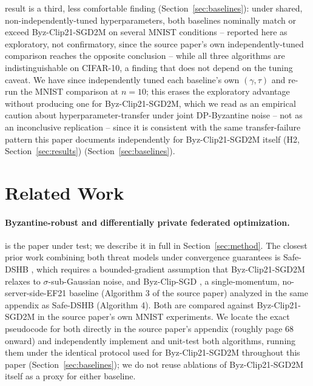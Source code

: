 \documentclass{article}
\begin{document}
result is a third, less comfortable finding (Section~\ref{sec:baselines}):
under shared, non-independently-tuned hyperparameters, both baselines
nominally match or exceed Byz-Clip21-SGD2M on several MNIST conditions --
reported here as exploratory, not confirmatory, since the source paper's own
independently-tuned comparison reaches the opposite conclusion -- while all
three algorithms are indistinguishable on CIFAR-10, a finding that does not
depend on the tuning caveat. We have since independently tuned each
baseline's own $(\gamma,\tau)$ and re-run the MNIST comparison at $n{=}10$;
this erases the exploratory advantage without producing one for
Byz-Clip21-SGD2M, which we read as an empirical caution about
hyperparameter-transfer under joint DP-Byzantine noise -- not as an
inconclusive replication -- since it is consistent with the same
transfer-failure pattern this paper documents independently for
Byz-Clip21-SGD2M itself (H2, Section~\ref{sec:results})
(Section~\ref{sec:baselines}).

\section{Related Work}

\paragraph{Byzantine-robust and differentially private federated optimization.}
\citet{islamov2026byzclip} is the paper under test; we describe it in full in
Section~\ref{sec:method}. The closest prior work combining both threat models
under convergence guarantees is Safe-DSHB \citep{allouah2023trilemma}, which
requires a bounded-gradient assumption that Byz-Clip21-SGD2M relaxes to
$\sigma$-sub-Gaussian noise, and Byz-Clip-SGD \citep{islamov2026byzclip}, a
single-momentum, no-server-side-EF21 baseline (Algorithm 3 of the source
paper) analyzed in the same appendix as Safe-DSHB (Algorithm 4). Both are
compared against Byz-Clip21-SGD2M in the source paper's own MNIST experiments.
We locate the exact pseudocode for both directly in the source paper's
appendix (roughly page 68 onward) and independently implement and unit-test
both algorithms, running them under the identical protocol used for
Byz-Clip21-SGD2M throughout this paper (Section~\ref{sec:baselines}); we do
not reuse ablations of Byz-Clip21-SGD2M itself as a proxy for either baseline.
\end{document}
